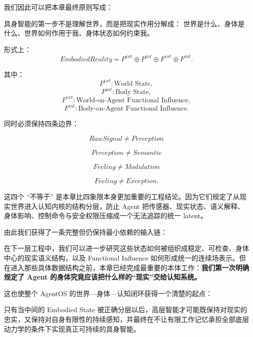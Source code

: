 我们因此可以把本章最终原则写成：
\begin{proposition*}
具身智能的第一步不是理解世界，而是把现实作用分解成：
世界是什么、身体是什么、世界如何作用于我、身体状态如何约束我。
\end{proposition*}

形式上：
\[
\boxed{
EmbodiedReality
=
P^{ext}
\oplus
P^{int}
\oplus
F^{ext}
\oplus
F^{int}.
}
\]

其中：
\[
P^{ext}
:
\text{World State},
\]
\[
P^{int}
:
\text{Body State},
\]
\[
F^{ext}
:
\text{World-on-Agent Functional Influence},
\]
\[
F^{int}
:
\text{Body-on-Agent Functional Influence}.
\]

同时必须保持四条边界：

\[
\boxed{
RawSignal\neq Perception
}
\]

\[
\boxed{
Perception\neq Semantic
}
\]

\[
\boxed{
Feeling\neq Modulation
}
\]

\[
\boxed{
Feeling\neq Exception.
}
\]

这四个 ``不等于'' 是本章比四象限本身更加重要的工程结论。因为它们规定了从现实世界进入认知内核的结构分层，防止 Agent 把传感器、现实状态、语义解释、身体影响、控制命令与安全权限压缩成一个无法追踪的统一 latent。

由此我们获得了一条完整但仍保持最小依赖的输入链：

\begin{statementbox}
\centering
{}
\end{statementbox}

在下一层工程中，我们可以进一步研究这些状态如何被组织成稳定、可检查、身体中心的现实语义结构，以及 Functional Influence 如何形成统一的连续场表示。但在进入那些具体数据结构之前，本章已经完成最重要的本体工作：\textbf{我们第一次明确规定了 Agent 的身体究竟应该把什么样的``现实''交给认知系统。}

这也使整个 AgentOS 的世界—身体—认知闭环获得一个清楚的起点：
\begin{statementbox}
\centering
{}
\end{statementbox}
只有当中间的 Embodied State 被正确分层以后，高层智能才可能既保持对现实的忠实，又保持对自身有限性的持续感知，并最终在不让有限工作记忆承担全部底层动力学的条件下实现真正可持续的具身智能。
